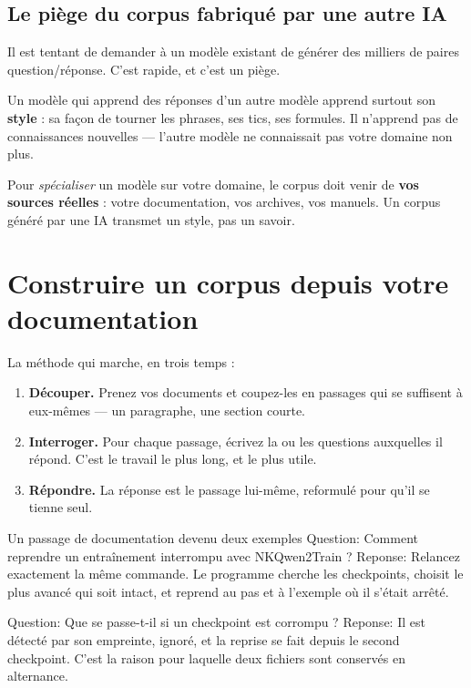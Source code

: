 \subsection{Le piège du corpus fabriqué par une autre IA}

Il est tentant de demander à un modèle existant de générer des milliers de
paires question/réponse. C'est rapide, et c'est un piège.

Un modèle qui apprend des réponses d'un autre modèle apprend surtout son
\textbf{style} : sa façon de tourner les phrases, ses tics, ses formules. Il
n'apprend pas de connaissances nouvelles — l'autre modèle ne connaissait pas
votre domaine non plus.

\begin{nkpiege}
Pour \emph{spécialiser} un modèle sur votre domaine, le corpus doit venir de
\textbf{vos sources réelles} : votre documentation, vos archives, vos manuels.
Un corpus généré par une IA transmet un style, pas un savoir.
\end{nkpiege}

\section{Construire un corpus depuis votre documentation}

La méthode qui marche, en trois temps :

\begin{enumerate}
  \item \textbf{Découper.} Prenez vos documents et coupez-les en passages qui
        se suffisent à eux-mêmes — un paragraphe, une section courte.
  \item \textbf{Interroger.} Pour chaque passage, écrivez la ou les questions
        auxquelles il répond. C'est le travail le plus long, et le plus utile.
  \item \textbf{Répondre.} La réponse est le passage lui-même, reformulé pour
        qu'il se tienne seul.
\end{enumerate}

\begin{nkcode}[]{Un passage de documentation devenu deux exemples}
Question: Comment reprendre un entraînement interrompu avec NKQwen2Train ?
Reponse: Relancez exactement la même commande. Le programme cherche les
checkpoints, choisit le plus avancé qui soit intact, et reprend au pas
et à l'exemple où il s'était arrêté.

Question: Que se passe-t-il si un checkpoint est corrompu ?
Reponse: Il est détecté par son empreinte, ignoré, et la reprise se fait
depuis le second checkpoint. C'est la raison pour laquelle deux fichiers
sont conservés en alternance.
\end{nkcode}

